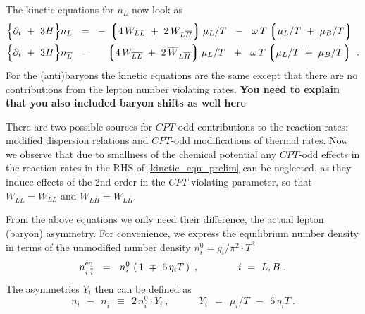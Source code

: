\documentclass[12pt]{revtex4}
\newcommand{\eq}{{\rm eq}}
\newcommand{\lgr}{\left\lgroup}
\newcommand{\rgr}{\right\rgroup}
\newcommand{\p}{\partial}
\newcommand{\ov}{\overline}
\begin{document}
	The kinetic equations for $ n_L $ now look as
\begin{equation}
\label{kinetic_eqn_prelim}
\begin{split}
	\Bigl\{ \p_t ~+~ 3H \Bigr\}
		n_L ~~=~~ & 
	-\, \lgr 4\, W_{LL} ~+~ 2\, W_{L\ov{H}} \rgr  \mu_L/T 
	~~-~~
	\omega\, T \lgr \mu_L/T ~+~ \mu_B/T \rgr 
	\\
	\Bigl\{ \p_t ~+~ 3H \Bigr\} 
		n_{\ov{L}} ~~=~~ &
	\phantom{-\,}
	\lgr 4\, W_{\ov{LL}} ~+~ 2\, \ov{W}_{L\ov{H}} \rgr  \mu_L/T 
	~~+~~
	\omega\, T \lgr \mu_L/T ~+~ \mu_B/T \rgr ~.
\end{split}
\end{equation}
	For the (anti)baryons the kinetic equations are the same except
	that there are no contributions from the lepton number violating
	rates. {\bf You need to explain that you also included baryon shifts as well here}

	There are two possible sources for $CPT$-odd contributions 
	to the reaction rates: modified dispersion relations and 
	$CPT$-odd modifications of thermal rates. Now we observe that due to smallness of the chemical potential
	any $CPT$-odd effects in the reaction rates in the RHS of 
	\eqref{kinetic_eqn_prelim} can be neglected, as
	they induce effects of the 2nd order in the $CPT$-violating parameter, so that
	$ W_{\ov{LL}} = W_{LL} $ and
	$ \ov{W}_{L\ov{H}} = W_{L\ov{H}} $.

	From the above equations we only need their difference, the actual
	lepton (baryon) asymmetry.
	For convenience, we express the equilibrium number density in terms
	of the unmodified number density 
	$ n_i^0 = g_i/\pi^2 \cdot T^3 $
\[
	n_{i,\ov{i}}^\eq ~~=~~ n_i^0\, \left(\, 1 ~\mp~ 6\,\eta_i T \,\right)~,
	\qquad\qquad{i ~=~ L, B}~.
\]
	The asymmetries $ Y_i $ then can be defined as
\[
	n_i ~~-~~ n_{\ov{i}} ~~\equiv~~ 2\, n_i^0 \cdot Y_i~,
	\qquad\quad Y_i ~~=~~ \mu_i/T ~~-~~ 6\,\eta_i T~.
\]
	
\end{document}
